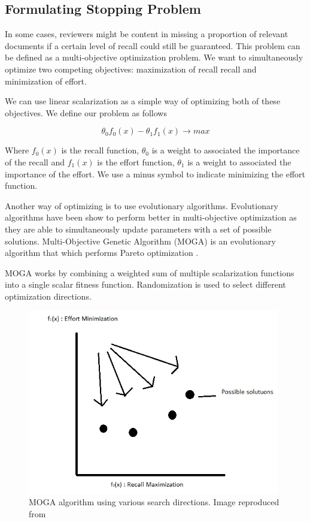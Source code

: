 \subsection{Formulating Stopping Problem} \label{stoppingProblem}

In some cases, reviewers might be content in missing a proportion of relevant documents if a certain level of recall could still be guaranteed. This problem can be defined as a multi-objective optimization problem. We want to simultaneously optimize two competing objectives: maximization of recall recall and minimization of effort. 

We can use linear scalarization \cite{Noghin2015} as a simple way of optimizing both of these objectives. We define our problem as follows

\begin{equation}
\theta_{0} f_0(x) -\theta_{1} f_1(x) \rightarrow max
\end{equation}

Where $f_0(x)$ is the recall function, $\theta_{0}$ is a weight to associated the importance of the recall and $f_1(x)$ is the effort function, $\theta_{1}$ is a weight to associated the importance of the effort. We use a minus symbol to indicate minimizing the effort function.

Another way of optimizing is to use evolutionary algorithms. Evolutionary algorithms have been show to perform better in multi-objective optimization \cite{Chiandussi:2012:CMO:2133849.2134037} as they are able to simultaneously update parameters with a set of possible solutions. Multi-Objective Genetic Algorithm (MOGA) is an evolutionary algorithm that which performs Pareto optimization \cite{489161}.

MOGA works by combining a weighted sum of multiple scalarization functions into a single scalar fitness function. Randomization is used to select different optimization directions.

\begin{figure}[H]
\center
\includegraphics[width=11cm]{figures/MOGA.png}
\caption{MOGA algorithm using various search directions. Image reproduced from \cite{489161}}
\end{figure}


